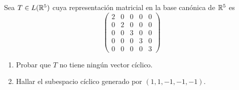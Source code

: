 \item Sea $T\in L(\mathbb{R}^5)$ cuya representación matricial en la base canónica de $\mathbb{R}^5$ es \[\begin{pmatrix}
        2&0&0&0&0\\0&2&0&0&0\\0&0&3&0&0\\0&0&0&3&0\\0&0&0&0&3
    \end{pmatrix}\]
    \begin{enumerate}
        \item Probar que $T$ no tiene ningún vector cíclico.
            \begin{mdframed}[style=s]
                
            \end{mdframed}
        \item Hallar el subespacio cíclico generado por $(1,1,-1,-1,-1)$.
            \begin{mdframed}[style=s]
                
            \end{mdframed}
    \end{enumerate}